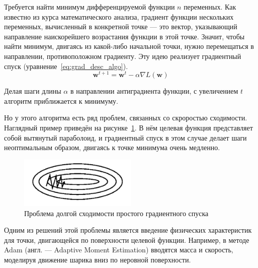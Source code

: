Требуется найти минимум дифференцируемой функции $n$ переменных. Как известно из курса математического анализа, градиент функции нескольких переменных, вычисленный в конкретной точке --- это вектор, указывающий направление наискорейшего возрастания функции в этой точке. Значит, чтобы найти минимум, двигаясь из какой-либо начальной точки, нужно перемещаться в направлении, противоположном градиенту. Эту идею реализует градиентный спуск (уравнение \ref*{eq:grad_desc_algo}).
\begin{equation}
    \label{eq:grad_desc_algo}
    \mathbf{w}^{t+1}=\mathbf{w}^t-\alpha\nabla L(\mathbf{w})
\end{equation}

Делая шаги длины $\alpha$ в направлении антиградиента функции, с увеличением $t$ алгоритм приближается к минимуму.

Но у этого алгоритма есть ряд проблем, связанных со скроростью сходимости. Наглядный пример приведён на рисунке \ref*{fig:grad_desc_problem}. В нём целевая функция представляет собой вытянутый параболоид, и градиентный спуск в этом случае делает шаги неоптимальным образом, двигаясь к точке минимума очень медленно.

\begin{figure}[h]
    \centering
    \includegraphics[width=0.5\textwidth]{../inc/images/gradient_descend_problem.png}
    \caption{Проблема долгой сходимости простого градиентного спуска}
    \label{fig:grad_desc_problem}
\end{figure}

Одним из решений этой проблемы является введение физических характеристик для точки, двигающейся по поверхности целевой функции. Например, в методе Adam (англ. --- Adaptive Moment Estimation) вводятся масса и скорость, моделируя движение шарика вниз по неровной поверхности.

